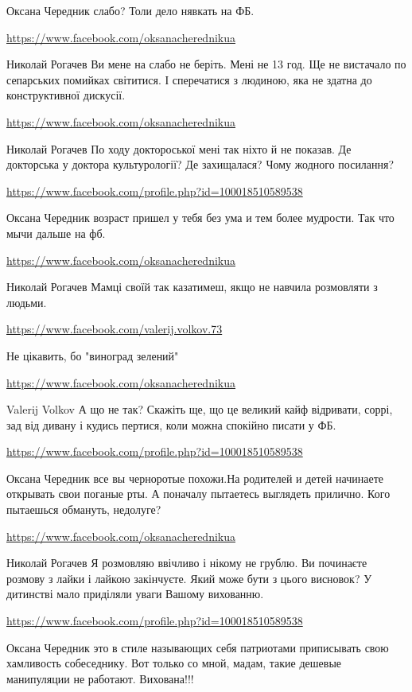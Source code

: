 \documentclass[a4paper,11pt]{extreport}
\begin{document}
\begin{itemize}
\begin{itemize}
Оксана Чередник слабо? Толи дело нявкать на ФБ.

\url{https://www.facebook.com/oksanacherednikua}

Николай Рогачев Ви мене на слабо не беріть. Мені не 13 год. Ще не вистачало по сепарських помийках світитися. І сперечатися з людиною, яка не здатна до конструктивної дискусії.

\url{https://www.facebook.com/oksanacherednikua}

Николай Рогачев По ходу доктороської мені так ніхто й не показав. Де докторська у доктора культурології? Де захищалася? Чому жодного посилання?

\url{https://www.facebook.com/profile.php?id=100018510589538}

Оксана Чередник возраст пришел у тебя без ума и тем более мудрости. Так что мычи дальше на фб.

\url{https://www.facebook.com/oksanacherednikua}

Николай Рогачев Мамці своїй так казатимеш, якщо не навчила розмовляти з людьми.

\url{https://www.facebook.com/valerij.volkov.73}

Не цікавить, бо "виноград зелений"

\url{https://www.facebook.com/oksanacherednikua}

Valerij Volkov А що не так? Скажіть ще, що це великий кайф відривати, соррі, зад від дивану і кудись пертися, коли можна спокійно писати у ФБ.

\url{https://www.facebook.com/profile.php?id=100018510589538}

Оксана Чередник все вы черноротые похожи.На родителей и детей начинаете открывать свои поганые рты. А поначалу пытаетесь выглядеть прилично. Кого пытаешься обмануть, недолуге?

\url{https://www.facebook.com/oksanacherednikua}

Николай Рогачев Я розмовляю ввічливо і нікому не грублю. Ви починаєте розмову з лайки і лайкою закінчуєте. Який може бути з цього висновок? У дитинстві мало приділяли уваги Вашому вихованню.

\url{https://www.facebook.com/profile.php?id=100018510589538}

Оксана Чередник это в стиле называющих себя патриотами приписывать свою хамливость собеседнику. Вот только со мной, мадам, такие дешевые манипуляции не работают. Вихована!!!


\end{itemize}
\end{itemize}
\end{document}
